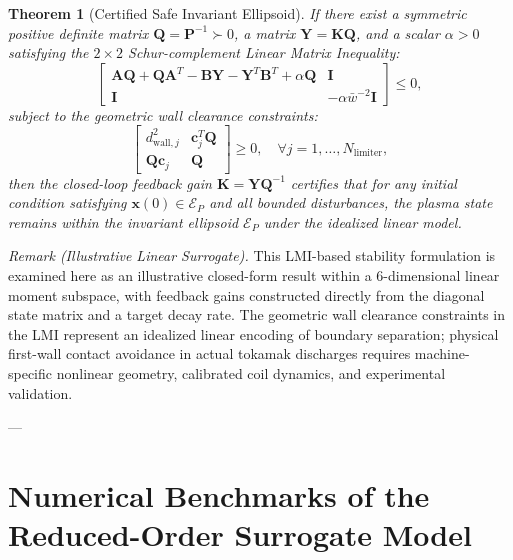 \documentclass[11pt,a4paper]{article}
\newtheorem{theorem}{Theorem}
\begin{document}
\begin{theorem}[Certified Safe Invariant Ellipsoid]
If there exist a symmetric positive definite matrix $\bm{Q} = \bm{P}^{-1} \succ 0$, a matrix $\bm{Y} = \bm{K} \bm{Q}$, and a scalar $\alpha > 0$ satisfying the $2 \times 2$ Schur-complement Linear Matrix Inequality:
\begin{equation}
    \renewcommand{\arraystretch}{1.35}
    \begin{bmatrix}
        \bm{A}\bm{Q} + \bm{Q}\bm{A}^T - \bm{B}\bm{Y} - \bm{Y}^T\bm{B}^T + \alpha \bm{Q} & \bm{I} \\
        \bm{I} & -\alpha \bar{w}^{-2} \bm{I}
    \end{bmatrix} \le 0,
    \label{eq:lmi_condition}
\end{equation}
subject to the geometric wall clearance constraints:
\begin{equation}
    \renewcommand{\arraystretch}{1.35}
    \begin{bmatrix}
        d_{\mathrm{wall}, j}^2 & \bm{c}_j^T \bm{Q} \\
        \bm{Q} \bm{c}_j & \bm{Q}
    \end{bmatrix} \ge 0, \quad \forall j = 1, \dots, N_{\mathrm{limiter}},
\end{equation}
then the closed-loop feedback gain $\bm{K} = \bm{Y} \bm{Q}^{-1}$ certifies that for any initial condition satisfying $\bm{x}(0) \in \mathcal{E}_P$ and all bounded disturbances, the plasma state remains within the invariant ellipsoid $\mathcal{E}_P$ under the idealized linear model.
\end{theorem}

\noindent\textit{Remark (Illustrative Linear Surrogate).}
This LMI-based stability formulation is examined here as an illustrative closed-form result within a 6-dimensional linear moment subspace, with feedback gains constructed directly from the diagonal state matrix and a target decay rate. The geometric wall clearance constraints in the LMI represent an idealized linear encoding of boundary separation; physical first-wall contact avoidance in actual tokamak discharges requires machine-specific nonlinear geometry, calibrated coil dynamics, and experimental validation.

---

\section{Numerical Benchmarks of the Reduced-Order Surrogate Model}
\end{document}

